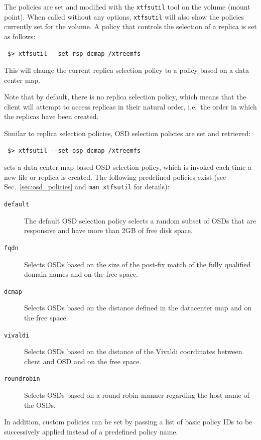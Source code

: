 \documentclass[a4paper,10pt]{book}
\begin{document}
The policies are set and modified with the \texttt{xtfsutil} tool on the volume (mount point). When called without any options, \texttt{xtfsutil} will also show the policies currently set for the volume. A policy that controls the selection of a replica is set as follows:

\begin{verbatim}
 $> xtfsutil --set-rsp dcmap /xtreemfs
\end{verbatim}

This will change the current replica selection policy to a policy based on a data center map.

Note that by default, there is no replica selection policy, which means that the client will attempt to access replicas in their natural order, i.e.\ the order in which the replicas have been created.

Similar to replica selection policies, OSD selection policies are set and retrieved:

\begin{verbatim}
 $> xtfsutil --set-osp dcmap /xtreemfs
\end{verbatim}

sets a data center map-based OSD selection policy, which is invoked each time a new file or replica is created. The following predefined policies exist (see Sec.\ \ref{sec:osd_policies} and \texttt{man xtfsutil} for details):

\begin{description}
 \item[\texttt{default}] The default OSD selection policy selects a random subset of OSDs that are responsive and have more than 2GB of free disk space.
 \item[\texttt{fqdn}] Selects OSDs based on the size of the post-fix match of the fully qualified domain names and on the free space.
 \item[\texttt{dcmap}] Selects OSDs based on the distance defined in the datacenter map and on the free space.
 \item[\texttt{vivaldi}] Selects OSDs based on the distance of the Vivaldi coordinates between client and OSD and on the free space.
  \item[\texttt{roundrobin}] Selects OSDs based on a round robin manner regarding the host name of the OSDs.
\end{description}

In addition, custom policies can be set by passing a list of basic policy IDs to be successively applied instead of a predefined policy name.
\end{document}
